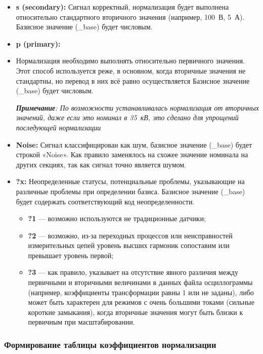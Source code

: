 \begin{itemize}
\item \textbf{s (secondary):} Сигнал корректный, нормализация будет выполнена относительно стандартного вторичного значения (например, 100~В, 5~А). Базисное значение (\_base) будет числовым.
\item \textbf{p (primary):}
\item Нормализация необходимо выполнять относительно первичного значения. Этот способ используется реже, в основном, когда вторичные значения не стандартны, но перевод в них всё равно осуществляется Базисное значение (\_base) будет числовым.

\mbox{}\par
\textit{\textbf{Примечание}: По возможности устанавливалась нормализация от вторичных значений, даже если это номинал в 35~кВ, это сделано для упрощений последующей нормализации}

\item \textbf{Noise:} Сигнал классифицирован как шум, базисное значение (\_base) будет строкой «Noise». Как правило заменялось на схожее значение номинала на других секциях, так как сигнал точно является шумом.
\item \textbf{?x:} Неопределенные статусы, потенциальные проблемы, указывающие на различные проблемы при определении базиса. Базисное значение (\_base) будет содержать соответствующий код неопределенности.
  \begin{itemize}
  \item \textbf{?1} --- возможно используются не традиционные датчики;
  \item \textbf{?2} --- возможно, из-за переходных процессов или неисправностей измерительных цепей уровень высших гармоник сопоставим или превышает уровень первой;
  \item \textbf{?3} --- как правило, указывает на отсутствие явного различия между первичными и вторичными величинами в данных файла осциллограммы (например, коэффициенты трансформации равны 1 или не заданы), либо может быть характерен для режимов с очень большими токами (сильные короткие замыкания), когда вторичные значения могут быть близки к первичным при масштабировании.
  \end{itemize}
\end{itemize}

\subsubsection{Формирование таблицы коэффициентов нормализации}\label{sec:ch3_normalization_coefficients_table}

